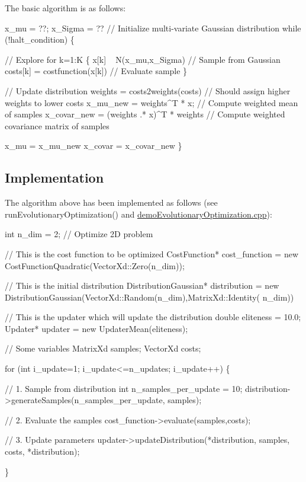 The basic algorithm is as follows\+: 
\begin{DoxyCode}
x\_mu = ??; x\_Sigma = ?? \textcolor{comment}{// Initialize multi-variate Gaussian distribution}
\textcolor{keywordflow}{while} (!halt\_condition) \{

    \textcolor{comment}{// Explore}
    \textcolor{keywordflow}{for} k=1:K \{
        x[k]     ~ N(x\_mu,x\_Sigma)    \textcolor{comment}{// Sample from Gaussian}
        costs[k] = costfunction(x[k]) \textcolor{comment}{// Evaluate sample}
    \}
        
    \textcolor{comment}{// Update distribution}
    weights = costs2weights(costs) \textcolor{comment}{// Should assign higher weights to lower costs}
    x\_mu\_new = weights^T * x; \textcolor{comment}{// Compute weighted mean of samples}
    x\_covar\_new = (weights .* x)^T * weights \textcolor{comment}{// Compute weighted covariance matrix of samples}
    
    x\_mu = x\_mu\_new
    x\_covar = x\_covar\_new
\}
\end{DoxyCode}
\hypertarget{page_bbo_sec_bbo_implementation}{}\subsection{Implementation}\label{page_bbo_sec_bbo_implementation}
The algorithm above has been implemented as follows (see run\+Evolutionary\+Optimization() and \hyperlink{demoEvolutionaryOptimization_8cpp}{demo\+Evolutionary\+Optimization.\+cpp})\+: 
\begin{DoxyCode}
\textcolor{keywordtype}{int} n\_dim = 2; \textcolor{comment}{// Optimize 2D problem}

\textcolor{comment}{// This is the cost function to be optimized}
CostFunction* cost\_function = \textcolor{keyword}{new} CostFunctionQuadratic(VectorXd::Zero(n\_dim));

\textcolor{comment}{// This is the initial distribution}
DistributionGaussian* distribution = \textcolor{keyword}{new} DistributionGaussian(VectorXd::Random(n\_dim),MatrixXd::Identity(
      n\_dim)) 

\textcolor{comment}{// This is the updater which will update the distribution}
double eliteness = 10.0;
Updater* updater = new UpdaterMean(eliteness);

\textcolor{comment}{// Some variables}
MatrixXd samples;
VectorXd costs;

for (\textcolor{keywordtype}{int} i\_update=1; i\_update<=n\_updates; i\_update++)
\{
  
    \textcolor{comment}{// 1. Sample from distribution}
    \textcolor{keywordtype}{int} n\_samples\_per\_update = 10;
    distribution->generateSamples(n\_samples\_per\_update, samples);
  
    \textcolor{comment}{// 2. Evaluate the samples}
    cost\_function->evaluate(samples,costs);
  
    \textcolor{comment}{// 3. Update parameters}
    updater->updateDistribution(*distribution, samples, costs, *distribution);
    
\}
\end{DoxyCode}
